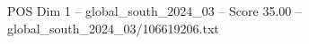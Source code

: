\begin{textsample}{POS Dim 1 – global\_south\_2024\_03 – Score 35.00 – global\_south\_2024\_03/106619206.txt}
\end{textsample}
